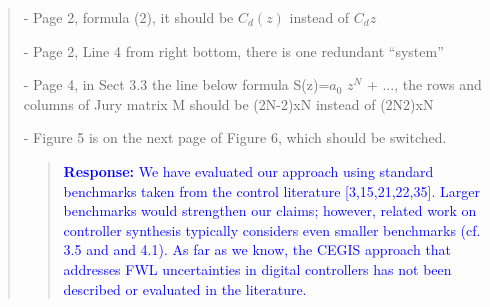 \documentclass[11pt]{article}
\begin{document}
\begin{quote}
- Page 2, formula (2), it should be $C_d(z)$ instead of $C_dz$

- Page 2, Line 4 from right bottom, there is one redundant ``system''

- Page 4, in Sect 3.3 the line below formula S(z)=$a_0$ $z^N$ + $...$, the rows and columns of Jury matrix M should be (2N-2)xN instead of (2N2)xN

- Figure 5 is on the next page of Figure 6, which should be switched.

\begin{quote}
\textcolor{blue}{\textbf{Response:} We have evaluated our approach using standard benchmarks taken from the control literature [3,15,21,22,35]. Larger benchmarks would strengthen our claims; however, related work on controller synthesis typically considers even smaller benchmarks (cf. 3.5 and and 4.1). As far as we know, the CEGIS approach that addresses FWL uncertainties in digital controllers has not been described or evaluated in the literature.}
\end{quote}

\end{quote}

\label{LastPage}
\end{document}
